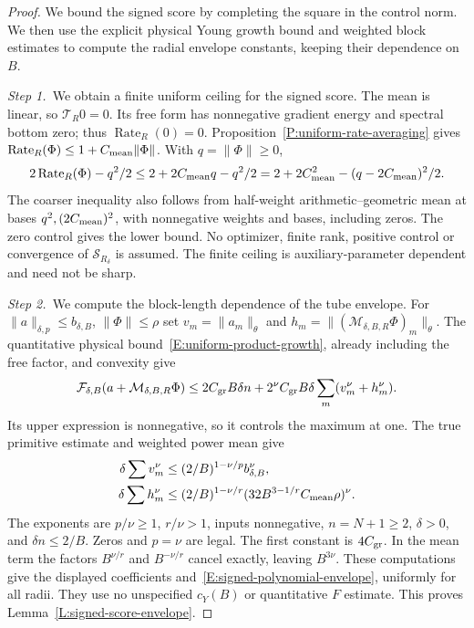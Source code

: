 \begin{proof}
  We bound the signed score by completing the square in the control norm. We
  then use the explicit physical Young growth bound and weighted block
  estimates to compute the radial envelope constants, keeping their dependence
  on $B$.


  \medskip
  \noindent\textit{Step 1.~}We obtain a finite uniform ceiling for the signed
  score.
  The mean is linear, so $\mathcal{T}_R0 = 0$. Its free form has nonnegative
  gradient energy and spectral bottom zero; thus $\operatorname{Rate}_R(0) = 0$.
  Proposition~\ref{P:uniform-rate-averaging} gives $\operatorname{Rate}_R(\Phi)
  \le 1+C_{\rm mean}\|\Phi\|$. With $q = \|\Phi\| \ge 0$,
  \[
    2\operatorname{Rate}_R(\Phi)-q^2/2
    \le2+2C_{\rm mean}q-q^2/2
    =2+2C_{\rm mean}^2-(q-2C_{\rm mean})^2/2 .
  \]
  The coarser inequality also follows from half-weight arithmetic--geometric
  mean at bases $q^2,(2C_{\rm mean})^2$, with nonnegative weights and bases,
  including zeros. The zero control gives the lower bound. No optimizer, finite
  rank, positive control or convergence of $\mathcal{S}_{R_\delta}$ is assumed.
  The finite ceiling is auxiliary-parameter dependent and need not be sharp.


  \medskip
  \noindent\textit{Step 2.~}We compute the block-length dependence of the tube
  envelope.
  For $\|a\|_{\delta,p} \le b_{\delta,B}$, $\|\Phi\| \le \rho$ set $v_m =
  \|a_m\|_\theta$ and $h_m = \|(\mathcal{M}_{\delta,B,R}\Phi)_m\|_\theta$. The
  quantitative physical bound~\eqref{E:uniform-product-growth}, already
  including the free factor, and convexity give
  \[
    \mathcal{F}_{\delta,B}(a+\mathcal{M}_{\delta,B,R}\Phi)
    \le2C_{\rm gr}B\delta n
    +2^\nu C_{\rm gr}B\delta\sum_m(v_m^\nu+h_m^\nu).
  \]
  Its upper expression is nonnegative, so it controls the maximum at one. The
  true primitive estimate and weighted power mean give
  \begin{align*}
    \delta\sum v_m^\nu&\le(2/B)^{1-\nu/p}b_{\delta,B}^\nu,\\
    \delta\sum h_m^\nu&\le(2/B)^{1-\nu/r}
    (32B^{3-1/r}C_{\rm mean}\rho)^\nu .
  \end{align*}
  The exponents are $p/\nu \ge 1$, $r/\nu > 1$, inputs nonnegative, $n = N+1 \ge
  2$, $\delta > 0$, and $\delta n \le 2/B$. Zeros and $p = \nu$ are legal. The
  first constant is $4C_{\rm gr}$. In the mean term the factors $B^{\nu/r}$ and
  $B^{-\nu/r}$ cancel exactly, leaving $B^{3\nu}$. These computations give the
  displayed coefficients and~\eqref{E:signed-polynomial-envelope}, uniformly for
  all radii. They use no unspecified $c_Y(B)$ or quantitative $F$ estimate. This
  proves Lemma~\ref{L:signed-score-envelope}.
\end{proof}

